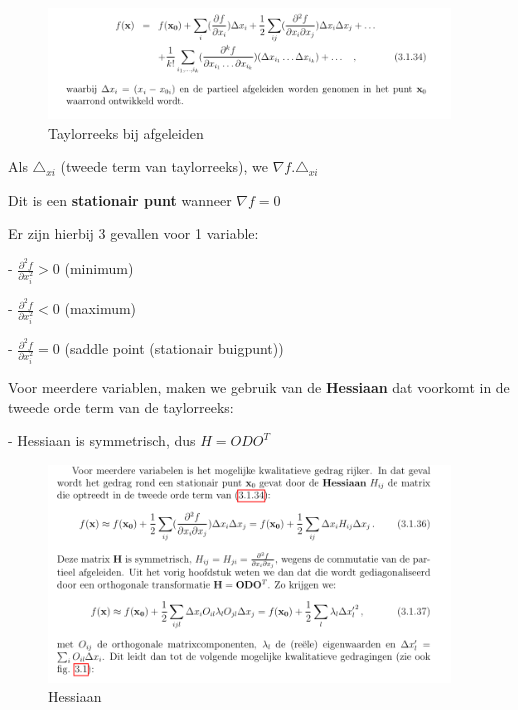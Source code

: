 \documentclass[a4paper]{report}
\begin{document}
\begin{figure}[H]
	\begin{center}
		\includegraphics[width=0.95\textwidth]{./images/taylor_afgeleid.png}
	\end{center}
	\caption{Taylorreeks bij afgeleiden}
	\label{}
\end{figure}

Als $\triangle_{xi}$ (tweede term van taylorreeks), we $\nabla f . \triangle_{xi}$

Dit is een \textbf{stationair punt} wanneer $\nabla f = 0$

Er zijn hierbij 3 gevallen voor 1 variable:

- $\frac{\partial^2 f}{\partial x_i^2} > 0$ (minimum)

- $\frac{\partial^2 f}{\partial x_i^2} < 0$ (maximum)

- $\frac{\partial^2 f}{\partial x_i^2} = 0$ (saddle point (stationair buigpunt))

Voor meerdere variablen, maken we gebruik van de \textbf{Hessiaan} dat voorkomt in de tweede orde term van de taylorreeks:

- Hessiaan is symmetrisch, dus $H = O D O^T$

\begin{figure}[H]
	\begin{center}
		\includegraphics[width=0.95\textwidth]{./images/hessiaan.png}
	\end{center}
	\caption{Hessiaan}
	\label{}
\end{figure}
\end{document}
